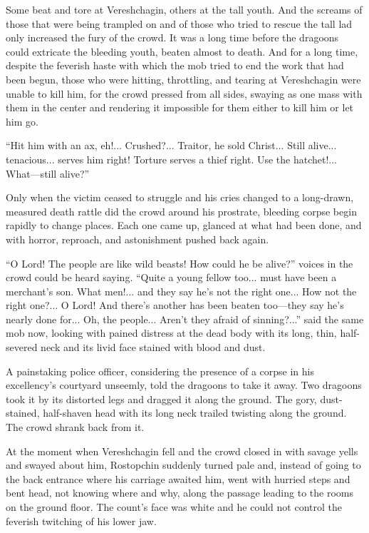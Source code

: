 Some beat and tore at Vereshchagin, others at the tall youth. And
the screams of those that were being trampled on and of those who
tried to rescue the tall lad only increased the fury of the
crowd. It was a long time before the dragoons could extricate the
bleeding youth, beaten almost to death. And for a long time,
despite the feverish haste with which the mob tried to end the
work that had been begun, those who were hitting, throttling, and
tearing at Vereshchagin were unable to kill him, for the crowd
pressed from all sides, swaying as one mass with them in the
center and rendering it impossible for them either to kill him or
let him go.

``Hit him with an ax, eh!... Crushed?... Traitor, he sold
Christ...  Still alive... tenacious... serves him right! Torture
serves a thief right. Use the hatchet!... What---still alive?''

Only when the victim ceased to struggle and his cries changed to
a long-drawn, measured death rattle did the crowd around his
prostrate, bleeding corpse begin rapidly to change places. Each
one came up, glanced at what had been done, and with horror,
reproach, and astonishment pushed back again.

``O Lord! The people are like wild beasts! How could he be
alive?'' voices in the crowd could be heard saying. ``Quite a
young fellow too... must have been a merchant's son. What
men!... and they say he's not the right one... How not the right
one?... O Lord! And there's another has been beaten too---they
say he's nearly done for... Oh, the people... Aren't they afraid
of sinning?...'' said the same mob now, looking with pained
distress at the dead body with its long, thin, half-severed neck
and its livid face stained with blood and dust.

A painstaking police officer, considering the presence of a
corpse in his excellency's courtyard unseemly, told the dragoons
to take it away.  Two dragoons took it by its distorted legs and
dragged it along the ground. The gory, dust-stained, half-shaven
head with its long neck trailed twisting along the ground. The
crowd shrank back from it.

At the moment when Vereshchagin fell and the crowd closed in with
savage yells and swayed about him, Rostopchin suddenly turned
pale and, instead of going to the back entrance where his
carriage awaited him, went with hurried steps and bent head, not
knowing where and why, along the passage leading to the rooms on
the ground floor. The count's face was white and he could not
control the feverish twitching of his lower jaw.


